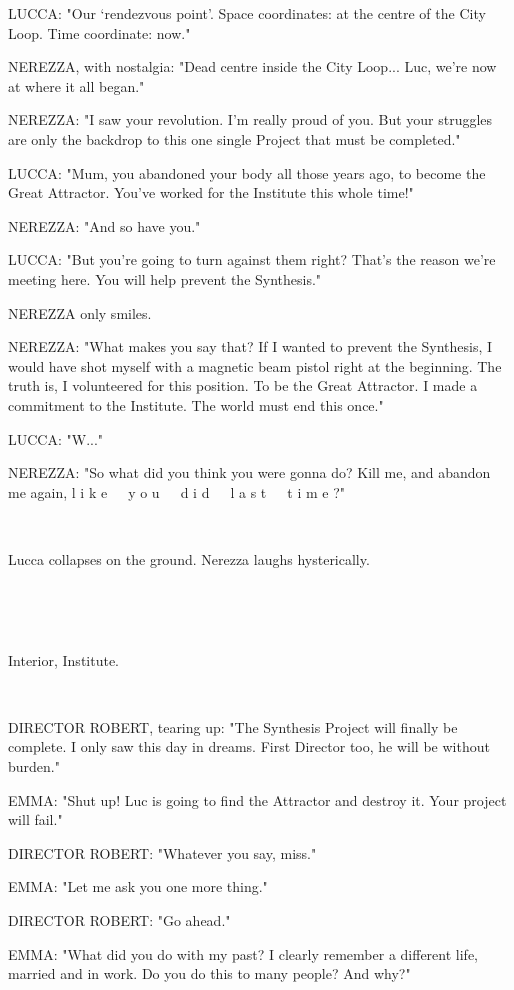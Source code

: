 \documentclass[11pt]{article}
\begin{document}
LUCCA: "Our `rendezvous point'.
Space coordinates: at the centre of the City Loop. 
Time coordinate: now."

NEREZZA, with nostalgia: "Dead centre inside the City Loop...
Luc, we're now at where it all began."

NEREZZA: "I saw your revolution. 
I'm really proud of you.
But your struggles are only the backdrop to this one single Project that must be completed."

LUCCA: "Mum, you abandoned your body all those years ago, to become the Great Attractor.
You've worked for the Institute this whole time!"

NEREZZA: "And so have you."

LUCCA: "But you're going to turn against them right?
That's the reason we're meeting here.
You will help prevent the Synthesis."

NEREZZA only smiles.

NEREZZA: "What makes you say that?
If I wanted to prevent the Synthesis, I would have shot myself with a magnetic beam pistol right at the beginning.
The truth is, I volunteered for this position.
To be the Great Attractor.
I made a commitment to the Institute.
The world must end this once."

LUCCA: "W..."

NEREZZA: "So what did you think you were gonna do?
Kill me, and abandon me again, 
l i k e\ \ \ y o u\ \ \ d i d\ \ \ l a s t\ \ \ t i m e ?"

\ 

Lucca collapses on the ground. 
Nerezza laughs hysterically.

\ 

\ 

Interior, Institute.

\ 

DIRECTOR ROBERT, tearing up: "The Synthesis Project will finally be complete.
I only saw this day in dreams.
First Director too, he will be without burden."

EMMA: "Shut up! Luc is going to find the Attractor and destroy it.
Your project will fail."

DIRECTOR ROBERT: "Whatever you say, miss."

EMMA: "Let me ask you one more thing."

DIRECTOR ROBERT: "Go ahead."

EMMA: "What did you do with my past?
I clearly remember a different life, married and in work.
Do you do this to many people?
And why?"
\end{document}
